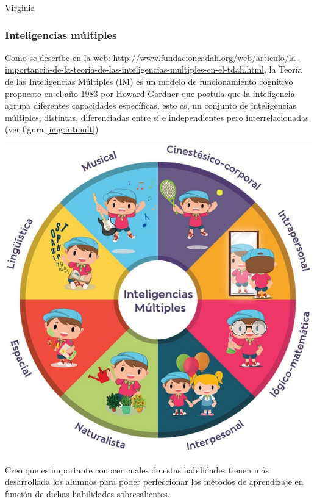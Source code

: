 \begin{opin}{\virgicolor}{Virginia}
\subsubsection{Inteligencias múltiples}

Como se describe en la web: \url{http://www.fundacioncadah.org/web/articulo/la-importancia-de-la-teoria-de-las-inteligencias-multiples-en-el-tdah.html}, la Teoría de las Inteligencias Múltiples (IM) es un modelo de funcionamiento cognitivo propuesto en el año 1983 por Howard Gardner que postula que la inteligencia agrupa diferentes capacidades específicas, esto es, un conjunto de inteligencias múltiples, distintas, diferenciadas entre sí e independientes pero interrelacionadas (ver figura \ref{img:intmult}) 


\begin{minipage}[h]{1.0\linewidth}
\centering
\includegraphics[scale=0.8]{img/im.jpg}
\label{img:intmult}
\end{minipage}



Creo que es importante conocer cuales de estas habilidades tienen más desarrollada los alumnos para poder perfeccionar los métodos de aprendizaje en función de dichas habilidades sobresalientes.


\end{opin}


